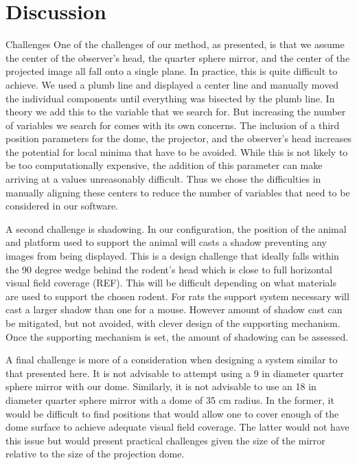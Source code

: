 \documentclass[10pt,letterpaper]{article}
\begin{document}
\section*{Discussion}

Challenges
One of the challenges of our method, as presented, is that we assume the center
of the observer’s head, the quarter sphere mirror, and the center of the
projected image all fall onto a single plane. In practice, this is quite
difficult to achieve. We used a plumb line and displayed a center line and
manually moved the individual components until everything was bisected by the
plumb line. In theory we add this to the variable that we search for. But
increasing the number of variables we search for comes with its own concerns.
The inclusion of a third position parameters for the dome, the projector, and
the observer’s head increases the potential for local minima that have to be
avoided. While this is not likely to be too computationally expensive, the
addition of this parameter can make arriving at a values unreasonably
difficult. Thus we chose the difficulties in manually aligning these centers to
reduce the number of variables that need to be considered in our software. 

A second challenge is shadowing. In our configuration, the position of the
animal and platform used to support the animal will casts a shadow preventing
any images from being displayed. This is a design challenge that ideally falls
within the 90 degree wedge behind the rodent’s head which is close to full
horizontal visual field coverage (REF). This will be difficult depending on
what materials are used to support the chosen rodent. For rats the support
system necessary will cast a larger shadow than one for a mouse. However amount
of shadow cast can be mitigated, but not avoided, with clever design of the
supporting mechanism. Once the supporting mechanism is set, the amount of
shadowing can be assessed.

A final challenge is more of a consideration when designing a system similar to
that presented here. It is not advisable to attempt using a 9 in diameter
quarter sphere mirror with our dome. Similarly, it is not advisable to use an
18 in diameter quarter sphere mirror with a dome of 35 cm radius. In the
former, it would be difficult to find positions that would allow one to cover
enough of the dome surface to achieve adequate visual field coverage. The
latter would not have this issue but would present practical challenges given
the size of the mirror relative to the size of the projection dome.  
\end{document}
